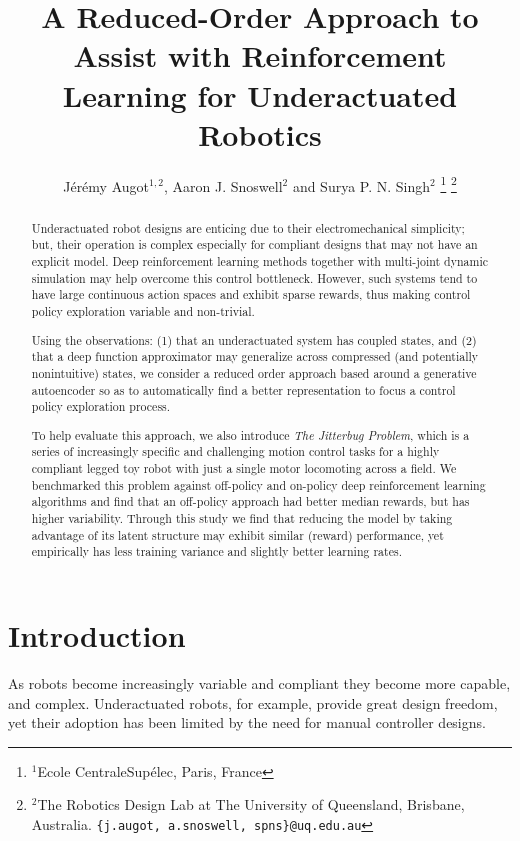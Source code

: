 \documentclass[letterpaper, 10 pt, conference]{ieeeconf}
\title{
    \LARGE \bf%
    A Reduced-Order Approach to Assist with Reinforcement Learning for Underactuated Robotics
}
\author{
    J\'er\'emy Augot$^{1,2}$, Aaron J. Snoswell$^{2}$ and Surya P. N. Singh$^{2}$
    \thanks{
        $^{1}$Ecole CentraleSup\'elec, Paris, France
    }%
    \thanks{
        $^{2}$The Robotics Design Lab at The University of Queensland, Brisbane, Australia.  
        {\texttt{\{j.augot, a.snoswell, spns\}@uq.edu.au}}
    }%
}
\begin{document}
\maketitle
\thispagestyle{empty}
\pagestyle{empty}

\begin{abstract}

Underactuated robot designs are enticing due to their electromechanical simplicity; but, their operation is complex especially for compliant designs that may not have an explicit model.
Deep reinforcement learning methods together with multi-joint dynamic simulation may help overcome this control bottleneck.
However, such systems tend to have large continuous action spaces and exhibit sparse rewards, thus making control policy exploration variable and non-trivial.  

Using the observations: (1) that an underactuated system has coupled states, and (2) that a deep function approximator may generalize across compressed (and potentially nonintuitive) states, we consider a reduced order approach based around a generative autoencoder so as to automatically find a better representation to focus a control policy exploration process. 

To help evaluate this approach, we also introduce \emph{The Jitterbug Problem}, which is a series of increasingly specific and challenging motion control tasks for a highly compliant legged toy robot with just a single motor locomoting across a field.  We benchmarked this problem against off-policy and on-policy deep reinforcement learning algorithms and find that an off-policy approach had better median rewards, but has higher variability. 
Through this study we find that reducing the model by taking advantage of its latent structure may exhibit similar (reward) performance, yet empirically has less training variance and slightly better learning rates.

\end{abstract}

\section{Introduction}

As robots become increasingly variable and compliant they become more capable, and complex.
Underactuated robots, for example, provide great design freedom, yet their adoption has been limited by the need for manual controller designs.
\end{document}

